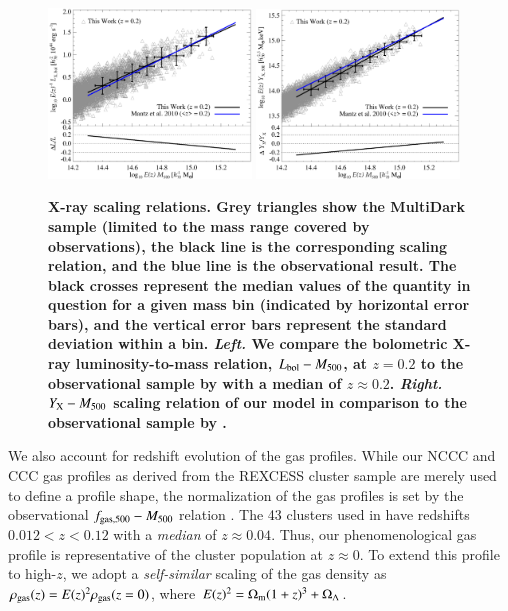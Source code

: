 \documentclass[useAMS,usenatbib]{mn2e}
\begin{document}
\begin{figure} 
\centering
\includegraphics[width=0.48\textwidth]{figures/lx_m.eps}
\includegraphics[width=0.48\textwidth]{figures/yx_m.eps}
\caption{{\bf X-ray scaling relations. Grey triangles show the MultiDark
  sample (limited to the mass range covered by observations), the black line is
  the corresponding scaling relation, and the blue line is the
  observational result. The black crosses represent the median values of the
  quantity in question for a given mass bin (indicated by horizontal error
  bars), and the vertical error bars represent the standard deviation within a
  bin.  \emph{Left.} We compare the bolometric X-ray luminosity-to-mass
  relation, $L_{{\mathrm{bol}}}-M_{500}$, at $z=0.2$ to the observational sample by
  \protect\cite{2010MNRAS.406.1773M} with a median of $z \approx 0.2$. 
  \emph{Right.} $Y_{{\mathrm{X}}}-M_{500}$ scaling relation of our model in comparison to the
  observational sample by \protect\cite{2010MNRAS.406.1773M}.}} 
\label{fig:X_LM}
\end{figure}

We also account for redshift evolution of the gas profiles. While our NCCC and
CCC gas profiles as derived from the REXCESS cluster sample are merely used to
define a profile shape, the normalization of the gas profiles is set by the
observational $f_{{\mathrm{gas}},500}-M_{500}$ relation \citep{2009ApJ...693.1142S}.
The 43 clusters used in \cite{2009ApJ...693.1142S} have redshifts $0.012 < z <
0.12$ with a \emph{median} of $z \approx 0.04$. Thus, our phenomenological gas
profile is representative of the cluster population at $z\approx0$. To extend
this profile to high-$z$, we adopt a \emph{self-similar} scaling of the gas
density as $\rho_{{\mathrm{gas}}}(z) = E(z)^{2} \rho_{{\mathrm{gas}}}(z=0)$, where
$E(z)^{2} = \Omega_{{\mathrm{m}}} (1+z)^{3} + \Omega_{{\Lambda}}$.
\end{document}
